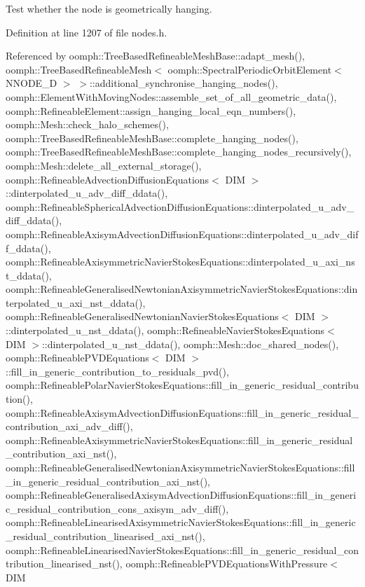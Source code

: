 Test whether the node is geometrically hanging. 



Definition at line 1207 of file nodes.\+h.



Referenced by oomph\+::\+Tree\+Based\+Refineable\+Mesh\+Base\+::adapt\+\_\+mesh(), oomph\+::\+Tree\+Based\+Refineable\+Mesh$<$ oomph\+::\+Spectral\+Periodic\+Orbit\+Element$<$ N\+N\+O\+D\+E\+\_\+D $>$ $>$\+::additional\+\_\+synchronise\+\_\+hanging\+\_\+nodes(), oomph\+::\+Element\+With\+Moving\+Nodes\+::assemble\+\_\+set\+\_\+of\+\_\+all\+\_\+geometric\+\_\+data(), oomph\+::\+Refineable\+Element\+::assign\+\_\+hanging\+\_\+local\+\_\+eqn\+\_\+numbers(), oomph\+::\+Mesh\+::check\+\_\+halo\+\_\+schemes(), oomph\+::\+Tree\+Based\+Refineable\+Mesh\+Base\+::complete\+\_\+hanging\+\_\+nodes(), oomph\+::\+Tree\+Based\+Refineable\+Mesh\+Base\+::complete\+\_\+hanging\+\_\+nodes\+\_\+recursively(), oomph\+::\+Mesh\+::delete\+\_\+all\+\_\+external\+\_\+storage(), oomph\+::\+Refineable\+Advection\+Diffusion\+Equations$<$ D\+I\+M $>$\+::dinterpolated\+\_\+u\+\_\+adv\+\_\+diff\+\_\+ddata(), oomph\+::\+Refineable\+Spherical\+Advection\+Diffusion\+Equations\+::dinterpolated\+\_\+u\+\_\+adv\+\_\+diff\+\_\+ddata(), oomph\+::\+Refineable\+Axisym\+Advection\+Diffusion\+Equations\+::dinterpolated\+\_\+u\+\_\+adv\+\_\+diff\+\_\+ddata(), oomph\+::\+Refineable\+Axisymmetric\+Navier\+Stokes\+Equations\+::dinterpolated\+\_\+u\+\_\+axi\+\_\+nst\+\_\+ddata(), oomph\+::\+Refineable\+Generalised\+Newtonian\+Axisymmetric\+Navier\+Stokes\+Equations\+::dinterpolated\+\_\+u\+\_\+axi\+\_\+nst\+\_\+ddata(), oomph\+::\+Refineable\+Generalised\+Newtonian\+Navier\+Stokes\+Equations$<$ D\+I\+M $>$\+::dinterpolated\+\_\+u\+\_\+nst\+\_\+ddata(), oomph\+::\+Refineable\+Navier\+Stokes\+Equations$<$ D\+I\+M $>$\+::dinterpolated\+\_\+u\+\_\+nst\+\_\+ddata(), oomph\+::\+Mesh\+::doc\+\_\+shared\+\_\+nodes(), oomph\+::\+Refineable\+P\+V\+D\+Equations$<$ D\+I\+M $>$\+::fill\+\_\+in\+\_\+generic\+\_\+contribution\+\_\+to\+\_\+residuals\+\_\+pvd(), oomph\+::\+Refineable\+Polar\+Navier\+Stokes\+Equations\+::fill\+\_\+in\+\_\+generic\+\_\+residual\+\_\+contribution(), oomph\+::\+Refineable\+Axisym\+Advection\+Diffusion\+Equations\+::fill\+\_\+in\+\_\+generic\+\_\+residual\+\_\+contribution\+\_\+axi\+\_\+adv\+\_\+diff(), oomph\+::\+Refineable\+Axisymmetric\+Navier\+Stokes\+Equations\+::fill\+\_\+in\+\_\+generic\+\_\+residual\+\_\+contribution\+\_\+axi\+\_\+nst(), oomph\+::\+Refineable\+Generalised\+Newtonian\+Axisymmetric\+Navier\+Stokes\+Equations\+::fill\+\_\+in\+\_\+generic\+\_\+residual\+\_\+contribution\+\_\+axi\+\_\+nst(), oomph\+::\+Refineable\+Generalised\+Axisym\+Advection\+Diffusion\+Equations\+::fill\+\_\+in\+\_\+generic\+\_\+residual\+\_\+contribution\+\_\+cons\+\_\+axisym\+\_\+adv\+\_\+diff(), oomph\+::\+Refineable\+Linearised\+Axisymmetric\+Navier\+Stokes\+Equations\+::fill\+\_\+in\+\_\+generic\+\_\+residual\+\_\+contribution\+\_\+linearised\+\_\+axi\+\_\+nst(), oomph\+::\+Refineable\+Linearised\+Navier\+Stokes\+Equations\+::fill\+\_\+in\+\_\+generic\+\_\+residual\+\_\+contribution\+\_\+linearised\+\_\+nst(), oomph\+::\+Refineable\+P\+V\+D\+Equations\+With\+Pressure$<$ D\+I\+M 